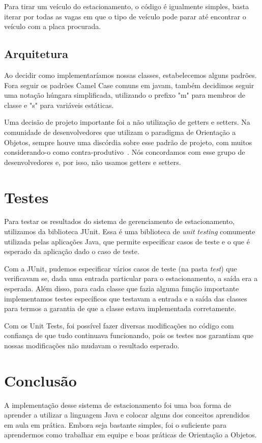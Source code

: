 \documentclass{article}
\begin{document}
Para tirar um veículo do estacionamento, o código é igualmente simples, basta iterar por todas as vagas em que o tipo de veículo pode parar até encontrar o veículo com a placa procurada.

\subsection{Arquitetura}
Ao decidir como implementaríamos nossas classes, estabelecemos alguns padrões. Fora seguir os padrões Camel Case comuns em javam, também decidimos seguir uma notação húngara simplificada, utilizando o prefixo "m" para membros de classe e "s" para variáveis estáticas. 

Uma decisão de projeto importante foi a não utilização de getters e setters. Na comunidade de desenvolvedores que utilizam o paradigma de Orientação a Objetos, sempre houve uma discórdia sobre esse padrão de projeto, com muitos considerando-o como contra-produtivo~\cite{evil}. Nós concordamos com esse grupo de desenvolvedores e, por isso, não usamos getters e setters.

\section{Testes}
Para testar os resultados do sistema de gerenciamento de estacionamento, utilizamos da biblioteca JUnit. Essa é uma biblioteca de \emph{unit testing} comumente utilizada pelas aplicações Java, que permite especificar casos de teste e o que é esperado da aplicação dado o caso de teste.

Com a JUnit, pudemos especificar vários casos de teste (na pasta \emph{test}) que verificavam se, dada uma entrada particular para o estacionamento, a saída era a esperada. Além disso, para cada classe que fazia alguma função importante implementamos testes específicos que testavam a entrada e a saída das classes para termos a garantia de que a classe estava implementada corretamente.

Com os Unit Tests, foi possível fazer diversas modificações no código com confiança de que tudo continuava funcionando, pois os testes nos garantiam que nossas modificações não mudavam o resultado esperado.

\section{Conclusão}
A implementação desse sistema de estacionamento foi uma boa forma de aprender a utilizar a linguagem Java e colocar alguns dos conceitos aprendidos em aula em prática. Embora seja bastante simples, foi o suficiente para aprendermos como trabalhar em equipe e boas práticas de Orientação a Objetos.



\end{document}
